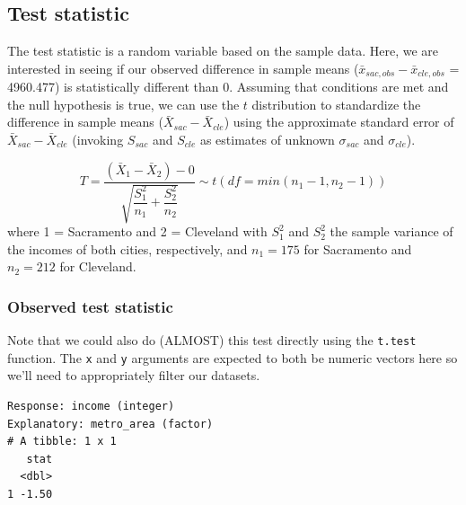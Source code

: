 \documentclass[12pt,]{krantz}
\makeatletter
\newenvironment{Shaded}{\begin{snugshade}}{\end{snugshade}}
\newcommand{\KeywordTok}[1]{\textcolor[rgb]{0.27,0.27,0.27}{\textbf{#1}}}
\newcommand{\DataTypeTok}[1]{\textcolor[rgb]{0.27,0.27,0.27}{#1}}
\newcommand{\StringTok}[1]{\textcolor[rgb]{0.5,0.5,0.5}{#1}}
\newcommand{\OperatorTok}[1]{\textcolor[rgb]{0.43,0.43,0.43}{\textbf{#1}}}
\newcommand{\NormalTok}[1]{#1}
\newenvironment{kframe}{%
\medskip{}
\setlength{\fboxsep}{.8em}
 \def\at@end@of@kframe{}%
 \ifinner\ifhmode%
  \def\at@end@of@kframe{\end{minipage}}%
  \begin{minipage}{\columnwidth}%
 \fi\fi%
 \def\FrameCommand##1{\hskip\@totalleftmargin \hskip-\fboxsep
 \colorbox{shadecolor}{##1}\hskip-\fboxsep
     \hskip-\linewidth \hskip-\@totalleftmargin \hskip\columnwidth}%
 \MakeFramed {\advance\hsize-\width
   \@totalleftmargin\z@ \linewidth\hsize
   \@setminipage}}%
 {\par\unskip\endMakeFramed%
 \at@end@of@kframe}
\renewenvironment{Shaded}{\begin{kframe}}{\end{kframe}}
\makeatother
\begin{document}
\subsection{Test statistic}\label{test-statistic-3}

The test statistic is a random variable based on the sample data. Here,
we are interested in seeing if our observed difference in sample means
(\(\bar{x}_{sac, obs} - \bar{x}_{cle, obs}\) = 4960.477) is
statistically different than 0. Assuming that conditions are met and the
null hypothesis is true, we can use the \(t\) distribution to
standardize the difference in sample means
(\(\bar{X}_{sac} - \bar{X}_{cle}\)) using the approximate standard error
of \(\bar{X}_{sac} - \bar{X}_{cle}\) (invoking \(S_{sac}\) and
\(S_{cle}\) as estimates of unknown \(\sigma_{sac}\) and
\(\sigma_{cle}\)).

\[ T =\dfrac{ (\bar{X}_1 - \bar{X}_2) - 0}{ \sqrt{\dfrac{S_1^2}{n_1} + \dfrac{S_2^2}{n_2}}  } \sim t (df = min(n_1 - 1, n_2 - 1)) \]
where 1 = Sacramento and 2 = Cleveland with \(S_1^2\) and \(S_2^2\) the
sample variance of the incomes of both cities, respectively, and
\(n_1 = 175\) for Sacramento and \(n_2 = 212\) for Cleveland.

\subsubsection*{Observed test
statistic}\label{observed-test-statistic-3}


Note that we could also do (ALMOST) this test directly using the
\texttt{t.test} function. The \texttt{x} and \texttt{y} arguments are
expected to both be numeric vectors here so we'll need to appropriately
filter our datasets.

\begin{Shaded}
\end{Shaded}

\begin{verbatim}
Response: income (integer)
Explanatory: metro_area (factor)
# A tibble: 1 x 1
   stat
  <dbl>
1 -1.50
\end{verbatim}
\end{document}

